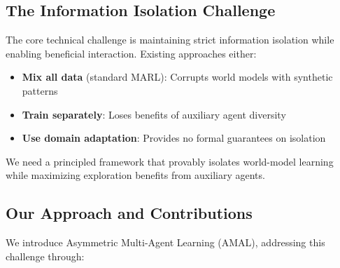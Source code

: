 \documentclass[12pt, a4paper]{article}
\begin{document}
\subsection{The Information Isolation Challenge}

The core technical challenge is maintaining strict information isolation while enabling beneficial interaction. Existing approaches either:
\begin{itemize}
\item \textbf{Mix all data} (standard MARL): Corrupts world models with synthetic patterns
\item \textbf{Train separately}: Loses benefits of auxiliary agent diversity
\item \textbf{Use domain adaptation}: Provides no formal guarantees on isolation
\end{itemize}

We need a principled framework that provably isolates world-model learning while maximizing exploration benefits from auxiliary agents.

\subsection{Our Approach and Contributions}

We introduce Asymmetric Multi-Agent Learning (AMAL), addressing this challenge through:
\end{document}
